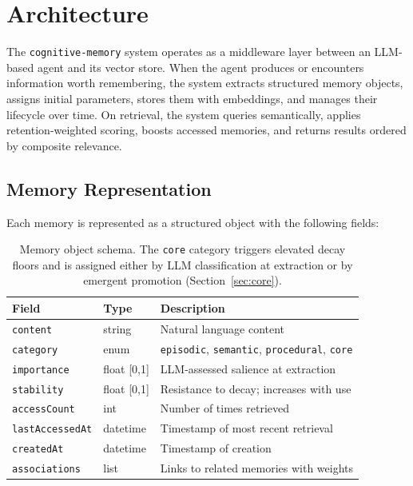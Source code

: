 \documentclass[11pt,a4paper]{article}
\begin{document}
\section{Architecture}

The \texttt{cognitive-memory} system operates as a middleware layer between an LLM-based agent and its vector store. When the agent produces or encounters information worth remembering, the system extracts structured memory objects, assigns initial parameters, stores them with embeddings, and manages their lifecycle over time. On retrieval, the system queries semantically, applies retention-weighted scoring, boosts accessed memories, and returns results ordered by composite relevance.

\subsection{Memory Representation}

Each memory is represented as a structured object with the following fields:

\begin{table}[htbp]
\centering
\small
\begin{tabular}{@{}lll@{}}
\toprule
\textbf{Field} & \textbf{Type} & \textbf{Description} \\
\midrule
\texttt{content} & string & Natural language content \\
\texttt{category} & enum & \texttt{episodic}, \texttt{semantic}, \texttt{procedural}, \texttt{core} \\
\texttt{importance} & float [0,1] & LLM-assessed salience at extraction \\
\texttt{stability} & float [0,1] & Resistance to decay; increases with use \\
\texttt{accessCount} & int & Number of times retrieved \\
\texttt{lastAccessedAt} & datetime & Timestamp of most recent retrieval \\
\texttt{createdAt} & datetime & Timestamp of creation \\
\texttt{associations} & list & Links to related memories with weights \\
\bottomrule
\end{tabular}
\caption{Memory object schema. The \texttt{core} category triggers elevated decay floors and is assigned either by LLM classification at extraction or by emergent promotion (Section~\ref{sec:core}).}
\label{tab:schema}
\end{table}
\end{document}
